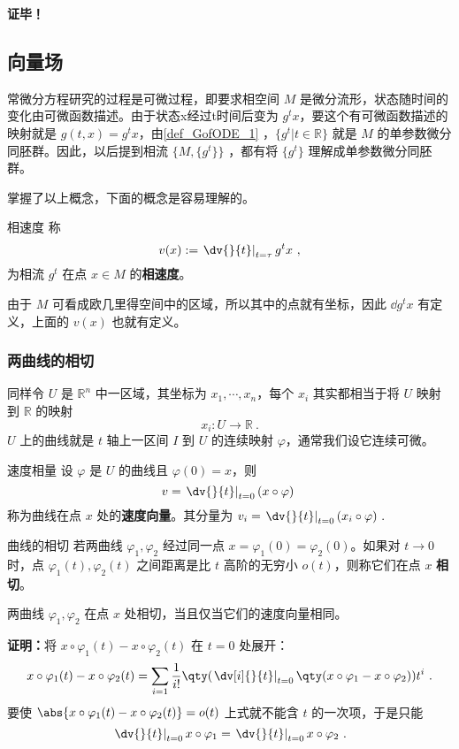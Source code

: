 \textbf{证毕！}
\subsection{向量场}\label{sub_GofODE_1}
常微分方程研究的过程是可微过程，即要求相空间 $M$ 是微分流形，状态随时间的变化由可微函数描述。由于状态x经过t时间后变为 $g^tx$，要这个有可微函数描述的映射就是 $g(t,x)=g^tx$，由\autoref{def_GofODE_1} ，$\{g^t|t\in\mathbb R\}$ 就是 $M$ 的单参数微分同胚群。因此，以后提到相流 $\{M,\{g^t\}\}$ ，都有将 $\{g^t\}$ 理解成单参数微分同胚群。

掌握了以上概念，下面的概念是容易理解的。
\begin{definition}{相速度}
称
\begin{equation}\label{eq_GofODE_2}
v(x):=\left.\dv{}{t}\right|_{t=\tau} g^tx~,
\end{equation}
为相流 $g^t$ 在点 $x\in M$ 的\textbf{相速度}。
\end{definition}
由于 $M$ 可看成欧几里得空间中的区域，所以其中的点就有坐标，因此 $\dd g^t x$ 有定义，上面的 $v(x)$ 也就有定义。

\subsubsection{两曲线的相切}
同样令 $U$ 是 $\mathbb R^n$ 中一区域，其坐标为 $x_1,\cdots,x_n$，每个 $x_i$ 其实都相当于将 $U$ 映射到 $\mathbb R$ 的映射
\begin{equation}
x_i:U\rightarrow\mathbb R~.
\end{equation}
$U$ 上的曲线就是 $t$ 轴上一区间 $I$ 到 $U$ 的连续映射 $\varphi$，通常我们设它连续可微。
\begin{definition}{速度相量}\label{def_GofODE_5}
设 $\varphi$ 是 $U$ 的曲线且 $\varphi(0)=x$，则
\begin{equation}
v=\left.\dv{}{t}\right|_{t=0}(x\circ\varphi)~
\end{equation}
称为曲线在点 $x$ 处的\textbf{速度向量}。其分量为 $v_i=\left.\dv{}{t}\right|_{t=0}(x_i\circ\varphi)~.$
\end{definition}
\begin{definition}{曲线的相切}
若两曲线 $\varphi_1,\varphi_2$ 经过同一点 $x=\varphi_1(0)=\varphi_2(0)$。如果对 $t\rightarrow0$ 时，点 $\varphi_1(t),\varphi_2(t)$ 之间距离是比 $t$ 高阶的无穷小 $o(t)$，则称它们在点 $x$ \textbf{相切}。
\end{definition}

\begin{theorem}{}
两曲线 $\varphi_1,\varphi_2$ 在点 $x$ 处相切，当且仅当它们的速度向量相同。
\end{theorem}
\textbf{证明：}将 $x\circ\varphi_1(t)-x\circ\varphi_2(t)$ 在 $t=0$ 处展开：
\begin{equation}
x\circ\varphi_1(t)-x\circ\varphi_2(t)=\sum_{i=1}\frac{1}{i!}\qty(\left.\dv[i]{}{t}\right|_{t=0}\qty(x\circ\varphi_1-x\circ\varphi_2))t^i~.
\end{equation}
要使 $\abs{x\circ\varphi_1(t)-x\circ\varphi_2(t)}=o(t)$ 上式就不能含 $t$ 的一次项，于是只能
\begin{equation}
\left.\dv{}{t}\right|_{t=0}x\circ\varphi_1=\left.\dv{}{t}\right|_{t=0}x\circ\varphi_2~.
\end{equation}

